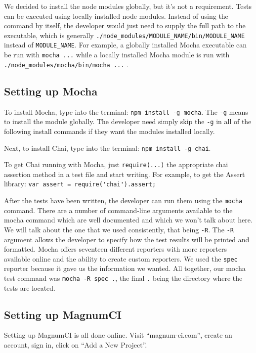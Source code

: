\documentclass[12pt]{ucthesis}
\begin{document}
We decided to install the node modules globally, but it's not a requirement. Tests can be executed using locally installed node modules. Instead of using the command by itself, the developer would just need to supply the full path to the executable, which is generally \lstinline{./node_modules/MODULE_NAME/bin/MODULE_NAME} \space instead of \lstinline{MODULE_NAME}. For example, a globally installed Mocha executable can be run with \lstinline{mocha ...} while a locally installed Mocha module is run with \lstinline{./node_modules/mocha/bin/mocha ...} \space .

\subsection{Setting up Mocha}
To install Mocha, type into the terminal: \lstinline{npm install -g mocha}. The \lstinline{-g} means to install the module globally. The developer need simply skip the \lstinline{-g} in all of the following install commands if they want the modules installed locally.

Next, to install Chai, type into the terminal: \lstinline{npm install -g chai}.

To get Chai running with Mocha, just \lstinline{require(...)} the appropriate chai assertion method in a test file and start writing. For example, to get the Assert library: \lstinline{var assert = require('chai').assert;}

After the tests have been written, the developer can run them using the \lstinline{mocha} command. There are a number of command-line arguments available to the mocha command which are well documented and which we won't talk about here. We will talk about the one that we used consistently, that being \lstinline{-R}. The \lstinline{-R} argument allows the developer to specify how the test results will be printed and formatted. Mocha offers seventeen different reporters with more reporters available online and the ability to create custom reporters. We used the \lstinline{spec} reporter because it gave us the information we wanted. All together, our mocha test command was \lstinline{mocha -R spec .}, the final \lstinline{.} being the directory where the tests are located.

\subsection{Setting up MagnumCI}
Setting up MagnumCI is all done online. Visit ``magnum-ci.com'', create an account, sign in, click on ``Add a New Project''.
\end{document}
